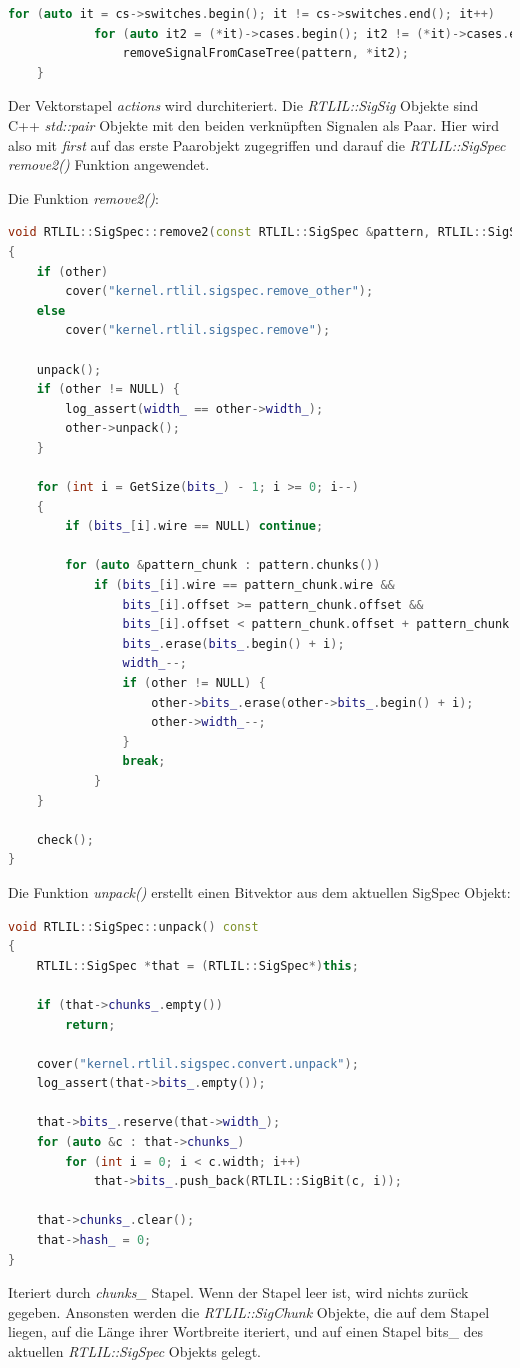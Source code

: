 \documentclass[11pt]{report}
\begin{document}
\begin{enumerate}
\begin{lstlisting}[language=C++]
		for (auto it = cs->switches.begin(); it != cs->switches.end(); it++)
			for (auto it2 = (*it)->cases.begin(); it2 != (*it)->cases.end(); it2++)
				removeSignalFromCaseTree(pattern, *it2);
	}

\end{lstlisting}
Der Vektorstapel \textit{actions} wird durchiteriert. 
Die \textit{RTLIL::SigSig} Objekte sind C++ \textit{std::pair} Objekte mit den beiden verknüpften Signalen als Paar.
Hier wird also mit \textit{first} auf das erste Paarobjekt zugegriffen und darauf die \textit{RTLIL::SigSpec remove2()} Funktion angewendet.

Die Funktion \textit{remove2()}:
\begin{lstlisting}[language=C++]
void RTLIL::SigSpec::remove2(const RTLIL::SigSpec &pattern, RTLIL::SigSpec *other)
{
	if (other)
		cover("kernel.rtlil.sigspec.remove_other");
	else
		cover("kernel.rtlil.sigspec.remove");

	unpack();
	if (other != NULL) {
		log_assert(width_ == other->width_);
		other->unpack();
	}

	for (int i = GetSize(bits_) - 1; i >= 0; i--)
	{
		if (bits_[i].wire == NULL) continue;

		for (auto &pattern_chunk : pattern.chunks())
			if (bits_[i].wire == pattern_chunk.wire &&
				bits_[i].offset >= pattern_chunk.offset &&
				bits_[i].offset < pattern_chunk.offset + pattern_chunk.width) {
				bits_.erase(bits_.begin() + i);
				width_--;
				if (other != NULL) {
					other->bits_.erase(other->bits_.begin() + i);
					other->width_--;
				}
				break;
			}
	}

	check();
}
\end{lstlisting}
Die Funktion \textit{unpack()} erstellt einen Bitvektor aus dem aktuellen SigSpec Objekt:
\begin{lstlisting}[language=C++]
void RTLIL::SigSpec::unpack() const
{
	RTLIL::SigSpec *that = (RTLIL::SigSpec*)this;

	if (that->chunks_.empty())
		return;

	cover("kernel.rtlil.sigspec.convert.unpack");
	log_assert(that->bits_.empty());

	that->bits_.reserve(that->width_);
	for (auto &c : that->chunks_)
		for (int i = 0; i < c.width; i++)
			that->bits_.push_back(RTLIL::SigBit(c, i));

	that->chunks_.clear();
	that->hash_ = 0;
}
\end{lstlisting}
Iteriert durch \textit{chunks\_} Stapel. Wenn der Stapel leer ist, wird nichts zurück gegeben. Ansonsten werden die \textit{RTLIL::SigChunk} Objekte, die auf dem Stapel liegen, auf die Länge ihrer Wortbreite iteriert, und auf einen Stapel bits\_ des aktuellen \textit{RTLIL::SigSpec} Objekts gelegt.



\end{enumerate}
\end{document}
